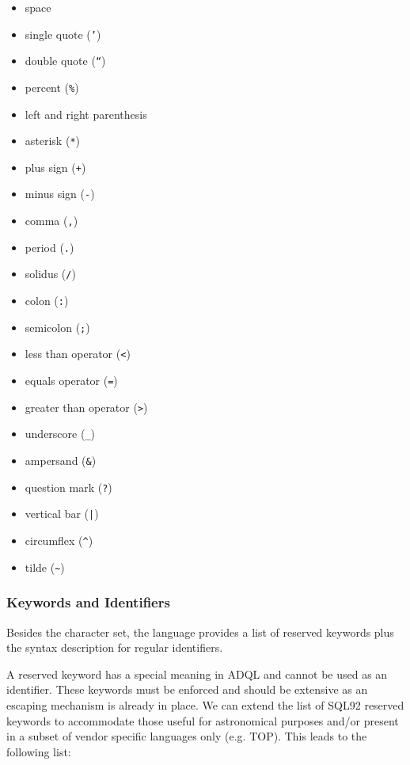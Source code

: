 \documentclass[11pt,a4paper]{ivoa}
\begin{document}
\begin{itemize}
    \item space
    \item single quote (\verb:’:)
    \item double quote (\verb:“:)
    \item percent (\verb:%:)
    \item left and right parenthesis
    \item asterisk (\verb:*:)
    \item plus sign (\verb:+:)
    \item minus sign (\verb:-:)
    \item comma (\verb:,:)
    \item period (\verb:.:)
    \item solidus (\verb:/:)
    \item colon (\verb.:.)
    \item semicolon (\verb:;:)
    \item less than operator (\verb:<:)
    \item equals operator (\verb:=:)
    \item greater than operator (\verb:>:)
    \item underscore (\verb:_:)
    \item ampersand (\verb:&:)
    \item question mark (\verb:?:)
    \item vertical bar (\verb:|:)
    \item circumflex (\verb:^:)
    \item tilde (\verb:~:)
\end{itemize}

\subsubsection{Keywords and Identifiers}
\label{sec:keywords}

Besides the character set, the language provides a list of reserved keywords
plus the syntax description for regular identifiers.

A reserved keyword has a special meaning in ADQL and cannot be used as
an identifier. These keywords must be enforced and should be extensive as
an escaping mechanism is already in place. We can extend the list of SQL92
reserved keywords to accommodate those useful for astronomical purposes and/or
present in a subset of vendor specific languages only (e.g. TOP). This leads
to the following list:
\end{document}
